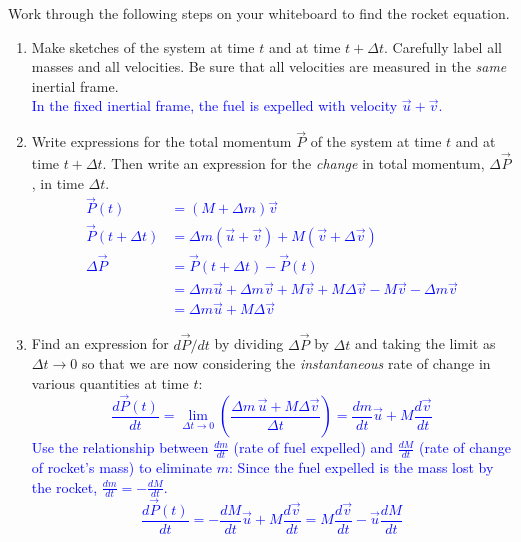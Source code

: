 \documentclass[11pt, letterpaper, openany]{book}
\newenvironment{exercise}[1][Exercise]{%
  \tcolorbox[blanker, breakable, left=1em,
    before skip=1em, after skip=1em,
    borderline west={3pt}{0pt}{PhysNavy},
    colback=PhysCream,
    before upper={\textcolor{PhysNavy}{\sffamily\bfseries #1:}\space}
  ]%
}{%
  \endtcolorbox%
}
\begin{document}
\begin{exercise}[Exercise 4]
Work through the following steps on your whiteboard to find the rocket equation.
\begin{enumerate}[label=(\alph*)]
    \item Make sketches of the system at time $t$ and at time $t + \Delta t$. Carefully label all masses and all velocities. Be sure that all velocities are measured in the \textit{same} inertial frame. \\
    \textcolor{blue}{In the fixed inertial frame, the fuel is expelled with velocity $\vec{u} + \vec{v}$.}
    
    \item Write expressions for the total momentum $\vec{P}$ of the system at time $t$ and at time $t + \Delta t$. Then write an expression for the \textit{change} in total momentum, $\Delta\vec{P}$, in time $\Delta t$. \\
    \textcolor{blue}{
    \begin{align*}
        \vec{P}(t) &= (M + \Delta m)\vec{v} \\
        \vec{P}(t+\Delta t) &= \Delta m(\vec{u} + \vec{v}) + M(\vec{v} + \Delta\vec{v}) \\
        \Delta\vec{P} &= \vec{P}(t+\Delta t) - \vec{P}(t) \\
        &= \Delta m\vec{u} + \Delta m\vec{v} + M\vec{v} + M\Delta\vec{v} - M\vec{v} - \Delta m\vec{v} \\
        &= \Delta m\vec{u} + M\Delta\vec{v}
    \end{align*}
    }
    
    \item Find an expression for $d\vec{P}/dt$ by dividing $\Delta\vec{P}$ by $\Delta t$ and taking the limit as $\Delta t \to 0$ so that we are now considering the \textit{instantaneous} rate of change in various quantities at time $t$: \\
    \textcolor{blue}{
    \[ \frac{d\vec{P}(t)}{dt} = \lim_{\Delta t\to 0}\left( \frac{\Delta m\,\vec{u} + M\Delta\vec{v}}{\Delta t} \right) = \frac{dm}{dt}\vec{u} + M\frac{d\vec{v}}{dt} \]
    Use the relationship between $\frac{dm}{dt}$ (rate of fuel expelled) and $\frac{dM}{dt}$ (rate of change of rocket's mass) to eliminate $m$:
    Since the fuel expelled is the mass lost by the rocket, $\frac{dm}{dt} = -\frac{dM}{dt}$.
    \[ \frac{d\vec{P}(t)}{dt} = - \frac{dM}{dt}\vec{u} + M\frac{d\vec{v}}{dt} = M\frac{d\vec{v}}{dt} - \vec{u}\frac{dM}{dt} \]
    }
\end{enumerate}
\end{exercise}
\end{document}
